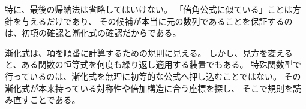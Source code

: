 特に、最後の帰納法は省略してはいけない。
「倍角公式に似ている」ことは方針を与えるだけであり、
その候補が本当に元の数列であることを保証するのは、初項の確認と漸化式の確認だからである。

漸化式は、項を順番に計算するための規則に見える。
しかし、見方を変えると、ある関数の恒等式を何度も繰り返し適用する装置でもある。
特殊関数型で行っているのは、漸化式を無理に初等的な公式へ押し込むことではない。
その漸化式が本来持っている対称性や倍加構造に合う座標を探し、
そこで規則を読み直すことである。
